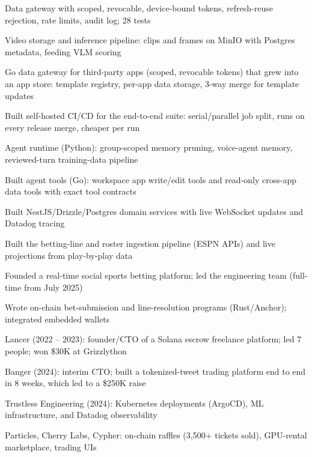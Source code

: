 \documentclass[print]{jack-resume}
\begin{document}
\begin{tightemize}
    \item Data gateway with scoped, revocable, device-bound tokens, refresh-reuse rejection, rate limits, audit log; 28 tests
    \item Video storage and inference pipeline: clips and frames on MinIO with Postgres metadata, feeding VLM scoring
    \item Go data gateway for third-party apps (scoped, revocable tokens) that grew into an app store: template registry, per-app data storage, 3-way merge for template updates
    \item Built self-hosted CI/CD for the end-to-end suite: serial/parallel job split, runs on every release merge, cheaper per run
    \item Agent runtime (Python): group-scoped memory pruning, voice-agent memory, reviewed-turn training-data pipeline
    \item Built agent tools (Go): workspace app write/edit tools and read-only cross-app data tools with exact tool contracts
\end{tightemize}
\sectionsep

\begin{tightemize}
    \item Built NestJS/Drizzle/Postgres domain services with live WebSocket updates and Datadog tracing
    \item Built the betting-line and roster ingestion pipeline (ESPN APIs) and live projections from play-by-play data
    \item Founded a real-time social sports betting platform; led the engineering team (full-time from July 2025)
    \item Wrote on-chain bet-submission and line-resolution programs (Rust/Anchor); integrated embedded wallets
\end{tightemize}
\sectionsep

\begin{tightemize}
    \item Lancer (2022 – 2023): founder/CTO of a Solana escrow freelance platform; led 7 people; won \$30K at Grizzlython
    \item Banger (2024): interim CTO; built a tokenized-tweet trading platform end to end in 8 weeks, which led to a \$250K raise
    \item Trustless Engineering (2024): Kubernetes deployments (ArgoCD), ML infrastructure, and Datadog observability
    \item Particles, Cherry Labs, Cypher: on-chain raffles (3,500+ tickets sold), GPU-rental marketplace, trading UIs
\end{tightemize}
\sectionsep
\end{document}
